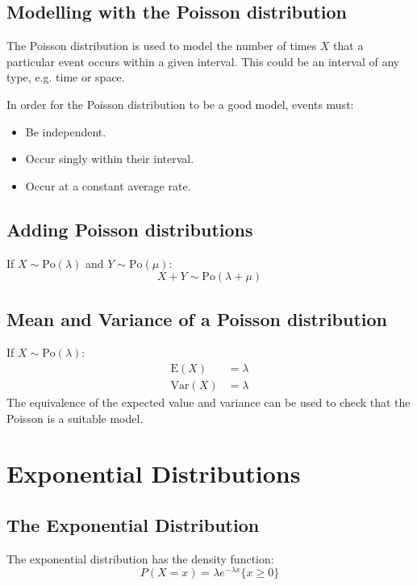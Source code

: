 \subsection{Modelling with the Poisson distribution}
The Poisson distribution is used to model the number of times \(X\) that a particular event occurs within a given interval. This could be an interval of any type, e.g. time or space.

In order for the Poisson distribution to be a good model, events must:
\begin{itemize}
    \item Be independent.
    \item Occur singly within their interval.
    \item Occur at a constant average rate.
\end{itemize}

\subsection{Adding Poisson distributions}
If \(X \sim \mathrm{Po}(\lambda)\) and \(Y \sim \mathrm{Po}(\mu)\):
\begin{equation*}
    X + Y \sim \mathrm{Po}(\lambda + \mu)
\end{equation*}

\subsection{Mean and Variance of a Poisson distribution}
If \(X \sim \mathrm{Po}(\lambda)\):
\begin{align*}
    \mathrm{E}(X)   & = \lambda \\
    \mathrm{Var}(X) & = \lambda
\end{align*}
The equivalence of the expected value and variance can be used to check that the Poisson is a suitable model.

\section{Exponential Distributions}
\subsection{The Exponential Distribution}
The exponential distribution has the density function:
\begin{equation*}
    P(X = x) = \lambda e^{-\lambda x} \{x \geq 0\}
\end{equation*}

